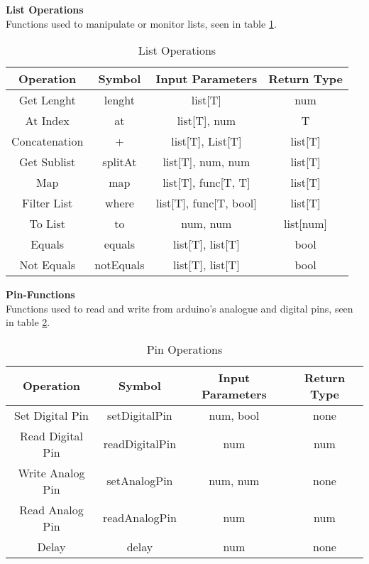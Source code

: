 \textbf{List Operations}\\
Functions used to manipulate or monitor lists, seen in table \ref{tbl:list}.
\begin{table}[h]
	\centering
	\caption{List Operations}
	\label{tbl:list}
	\begin{tabular}{|c|c|c|c|}
		\hline
		\textbf{Operation}     & \textbf{Symbol}  & \textbf{Input Parameters}            & \textbf{Return Type} \\ \hline
		Get Lenght    & lenght    & list{[}T{]}                 & num         \\ \hline
		At Index      & at        & list{[}T{]}, num            & T           \\ \hline
		Concatenation & +         & list{[}T{]}, List{[}T{]}    & list{[}T{]} \\ \hline
		Get Sublist   & splitAt   & list{[}T{]}, num, num       & list{[}T{]} \\ \hline
		Map           & map       & list{[}T{]}, func[T, T]     & list{[}T{]} \\ \hline
		Filter List   & where     & list{[}T{]}, func[T, bool]  & list{[}T{]} \\ \hline
		To List       & to        & num, num                    & list[num]   \\ \hline
		Equals        & equals    & list{[}T{]}, list{[}T{]}    & bool        \\ \hline
		Not Equals    & notEquals & list{[}T{]}, list{[}T{]}    & bool        \\ \hline
	\end{tabular}
\end{table}
\newpage

\textbf{Pin-Functions}\\
Functions used to read and write from arduino's analogue and digital pins, seen in table \ref{tbl:pins}.
\begin{table}[h]
	\centering
	\caption{Pin Operations}
	\label{tbl:pins}
	\begin{tabular}{|c|c|c|c|}
		\hline
		\textbf{Operation}                                                      & \textbf{Symbol}         & \textbf{Input Parameters} & \textbf{Return Type} \\ \hline
		Set Digital Pin                                                & setDigitalPin  & num, bool        & none        \\ \hline
		Read Digital Pin                                               & readDigitalPin & num              & num         \\ \hline
		Write Analog Pin                                               & setAnalogPin   & num, num         & none        \\ \hline
		Read Analog Pin                                                & readAnalogPin  & num              & num         \\ \hline
		Delay                                                          & delay          & num              & none        \\ \hline
	\end{tabular}
\end{table}

